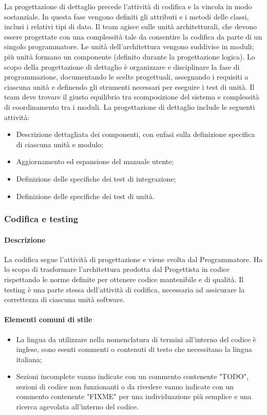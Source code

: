 \label{progettazione-dettaglio}
\par La progettazione di dettaglio precede l’attività di codifica e la vincola in modo sostanziale. In questa fase vengono definiti gli attributi e i metodi delle classi, inclusi i relativi tipi di dato. Il team agisce sulle unità architetturali, che devono essere progettate con una complessità tale da consentire la codifica da parte di un singolo programmatore. Le unità dell’architettura vengono suddivise in moduli; più unità formano un componente (definito durante la progettazione logica). Lo scopo della progettazione di dettaglio è organizzare e disciplinare la fase di programmazione, documentando le scelte progettuali, assegnando i requisiti a ciascuna unità e definendo gli strumenti necessari per eseguire i test di unità. Il team deve trovare il giusto equilibrio tra scomposizione del sistema e complessità di coordinamento tra i moduli. La progettazione di dettaglio include le seguenti attività:
\begin{itemize}
  \item Descrizione dettagliata dei componenti, con enfasi sulla definizione specifica di ciascuna unità e modulo;
  \item Aggiornamento ed espansione del manuale utente;
  \item Definizione delle specifiche dei test di integrazione;
  \item Definizione delle specifiche dei test di unità.
\end{itemize}


\subsubsection{Codifica e testing}\label{codificatesting}
\paragraph{Descrizione}
La codifica segue l'attività di progettazione e viene svolta dal Programmatore. Ha lo scopo di trasformare l'architettura prodotta dal Progettista in codice rispettando le norme definite per ottenere codice mantenibile e di qualità. Il testing è una parte stessa dell'attività di codifica, necessaria ad assicurare la correttezza di ciascuna unità software.

\paragraph{Elementi comuni di stile}
\begin{itemize}
  \item La lingua da utilizzare nella nomenclatura di termini all'interno del codice è inglese, sono esenti commenti o contenuti di testo che necessitano la lingua italiana;
  \item Sezioni incomplete vanno indicate con un commento contenente "TODO", sezioni di codice non funzionanti o da rivedere vanno indicate con un commento contenente "FIXME" per una individuazione più semplice e una ricerca agevolata all'interno del codice.
\end{itemize}


